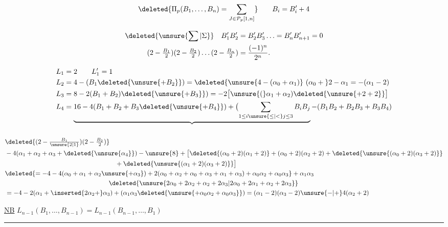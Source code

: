 \[
\deleted{\Pi_p(B_1,\ldots,B_n)=\sum_{J\in\mathcal P_p[1,n]}}\qquad B_i=B'_i+4
\]

\[
\begin{aligned}
\deleted{\unsure{\sum|\Sigma}}\quad B'_1B'_2&=B'_2B'_3\ldots=B'_nB'_{n+1}=0\\
(2-\tfrac{B_1}{2})(2-\tfrac{B_2}{2})\ldots(2-\tfrac{B_n}{2})&=\frac{(-1)^n}{2^{n}}.
\end{aligned}
\]

\[
\begin{aligned}
L_1&=2\qquad L'_1=1\\
L_2&=4-(B_1\deleted{\unsure{+B_2}})=\deleted{\unsure{4-(\alpha_0+\alpha_1)}\ (\alpha_0+{}}2-\alpha_1=-(\alpha_1-2)\\
L_3&=8-2(B_1+B_2)\deleted{\unsure{+B_3}})=-2\bigl[\unsure{(}\alpha_1+\alpha_2)\deleted{\unsure{+2+2}}\bigr]\\
L_4&=\underbrace{16-4(B_1+B_2+B_3\deleted{\unsure{+B_4}})+\bigl(\sum_{1\le i\unsure{\le|<}j\le3}B_iB_j}_{\phantom{16}}
-(B_1B_2+B_2B_3+B_3B_4)
\end{aligned}
\]

\[
\begin{aligned}
&\deleted{(2-\tfrac{B_1}{\unsure{2|1}})(2-\tfrac{B_2}{2})}\\
&-4(\alpha_1+\alpha_2+\alpha_3+\deleted{\unsure{\alpha_4}})-\unsure{8}+ \bigl[\deleted{(\alpha_0+2)(\alpha_1+2)}+(\alpha_0+2)(\alpha_2+2)+\deleted{\unsure{(\alpha_0+2)(\alpha_3+2)}}\\
&\hspace{17em}+\deleted{\unsure{(\alpha_1+2)(\alpha_3+2)}}\bigr]\\
&\deleted{=-4-4(\alpha_0+\alpha_1+\alpha_2\unsure{+\alpha_3})+2(\alpha_0+\alpha_2+\alpha_0+\alpha_3+\alpha_1+\alpha_3)+\alpha_0\alpha_2+\alpha_0\alpha_3}+\alpha_1\alpha_3\\
&\hspace{16em}\deleted{\unsure{2\alpha_0+2\alpha_2+\alpha_2+2\alpha_3|2\alpha_0+2\alpha_1+\alpha_2+2\alpha_3}}\\
&=-4-2(\alpha_1+\inserted{2\alpha_2+}\alpha_3)+(\alpha_1\alpha_3\deleted{\unsure{+\alpha_0\alpha_2+\alpha_0\alpha_3}})=(\alpha_1-2)(\alpha_3-2)\unsure{-|+}4(\alpha_2+2)
\end{aligned}
\]

\uline{NB} $L_{n-1}(B_1,\ldots,B_{n-1})=L_{n-1}(B_{n-1},\ldots,B_1)$

\begin{center}\rule{2.5cm}{0.35pt}\end{center}

